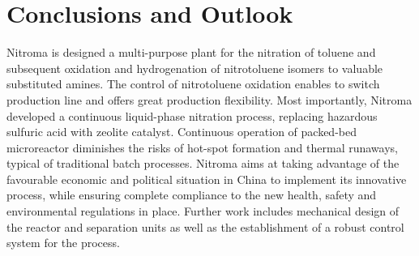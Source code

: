 \section{Conclusions and Outlook}
\label{sec:conclu}
Nitroma is designed a multi-purpose plant for the nitration of toluene and subsequent oxidation and hydrogenation of nitrotoluene isomers to valuable substituted amines. The control of nitrotoluene oxidation enables to switch production line and offers great production flexibility. Most importantly, Nitroma developed a continuous liquid-phase nitration process, replacing hazardous sulfuric acid with zeolite catalyst. Continuous operation of packed-bed microreactor diminishes the risks of hot-spot formation and thermal runaways, typical of traditional batch processes. Nitroma aims at taking advantage of the favourable economic and political situation in China to implement its innovative process, while ensuring complete compliance to the new health, safety and environmental regulations in place. Further work includes mechanical design of the reactor and separation units as well as the establishment of a robust control system for the process. 